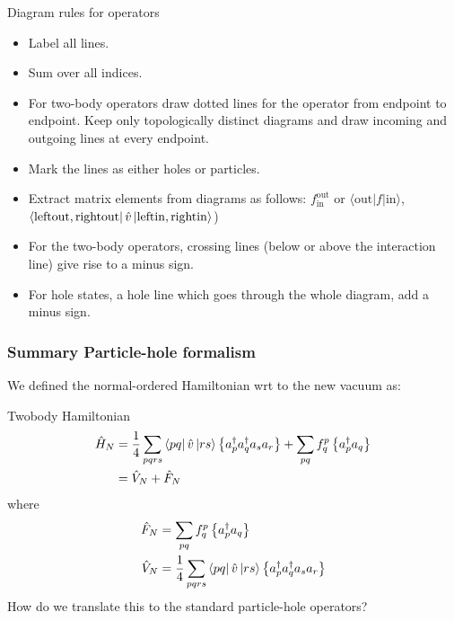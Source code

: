 \begin{frame}{Diagram rules for operators}
    \begin{itemize}
        \item Label all lines.
        \item Sum over all indices. 
        \item For two-body operators draw dotted lines for the operator from endpoint to endpoint. 
Keep only topologically distinct diagrams and draw incoming and outgoing lines at every endpoint.
\item Mark the lines as either holes or particles. 
        \item Extract matrix elements from diagrams as follows: $f_{\mathrm{in}}^{\mathrm{out}}$ or 
$\langle \mathrm{out}|f|\mathrm{in}\rangle$, 
            $\bra{\mathrm{leftout, rightout}}\hat{v}\,|{\mathrm{leftin, rightin}}\rangle$)
\item For the two-body operators, crossing lines (below or above the interaction line) 
give rise to a minus sign.
\item For hole states, a hole line which goes through the whole diagram, add a minus sign.  
    \end{itemize}
\end{frame}





\frame
{
  \frametitle{Summary Particle-hole formalism}
\begin{small}
{\scriptsize
We defined the normal-ordered Hamiltonian wrt to the new vacuum as:
    \begin{block}{Twobody Hamiltonian}
    \begin{align*}
        \hat{H}_N &= 
            \frac{1}{4} \sum_{pqrs} \bra{pq}\hat{v}\,|{rs}\rangle \left\{a^\dagger_p a^\dagger_q a_s  a_r\right\} 
            + \sum_{pq} f_q^p \left\{a^\dagger_p a_q\right\} \\
        &= \hat{V}_N + \hat{F}_N
    \end{align*}
    where
    \begin{subequations}
    \begin{align*}
        \hat{F}_N &= \sum_{pq} f_q^p \left\{a^\dagger_p a_q\right\} \\
        \hat{V}_N &= \frac{1}{4} \sum_{pqrs} \bra{pq}\hat{v}\,|{rs}\rangle \left\{a^\dagger_p a^\dagger_q a_s  a_r\right\} \\
    \end{align*}
    \end{subequations}
How do we translate this to the standard particle-hole operators?
    \end{block}
}
\end{small}
}



